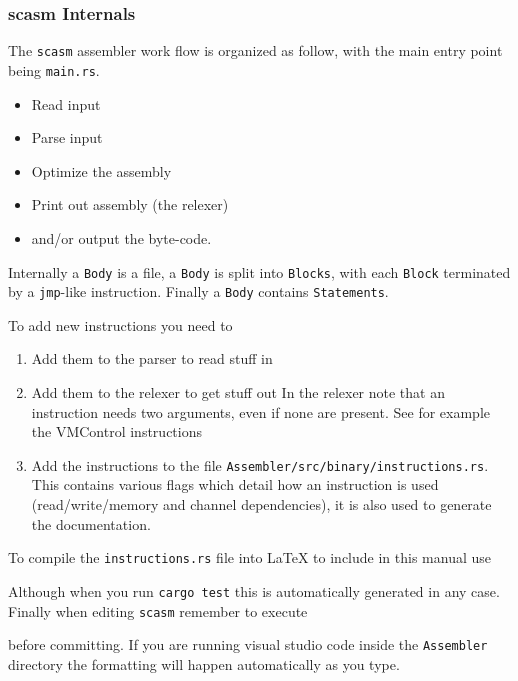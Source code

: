 \subsubsection{scasm Internals}
The \verb+scasm+ assembler work flow is organized as follow, with the main entry point
being \verb+main.rs+.
\begin{itemize}
\item Read input
\item Parse input
\item Optimize the assembly
\item Print out assembly (the relexer)
\item and/or output the byte-code.
\end{itemize}
Internally a \verb+Body+ is a file, a \verb+Body+ is split into
\verb+Blocks+, with each \verb+Block+ terminated by a \verb+jmp+-like instruction.
Finally a \verb+Body+ contains \verb+Statements+.

\vspace{5mm}

\noindent To add new instructions you need to
\begin{enumerate}
\item Add them to the parser to read stuff in
\item Add them to the relexer to get stuff out
      In the relexer note that an instruction needs two arguments,
      even if none are present. See for example the VMControl
      instructions

\item Add the instructions to the file \verb+Assembler/src/binary/instructions.rs+.
      This contains various flags which detail how an instruction is used
      (read/write/memory and channel dependencies), it is also used to generate
      the documentation.
\end{enumerate}
To compile the \verb+instructions.rs+ file into LaTeX to include in
this manual use


\noindent Although when you run \verb+cargo test+ this is automatically
generated in any case. \\

\noindent
Finally when editing \verb+scasm+ remember to execute


\noindent before committing. If you are running visual studio code inside the \verb+Assembler+ directory
the formatting will happen automatically as you type.

